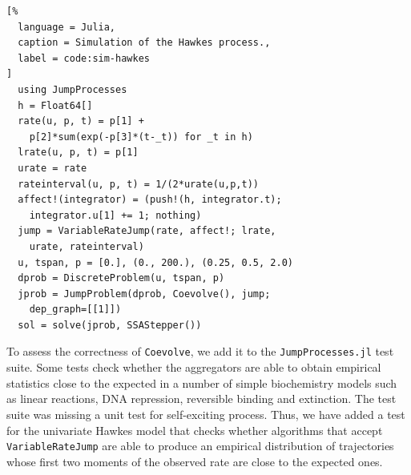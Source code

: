 \documentclass{juliacon}
\numberwithin{equation}{section}
\begin{document}
\begin{lstlisting}[%
  language = Julia,
  caption = Simulation of the Hawkes process.,
  label = code:sim-hawkes
]
  using JumpProcesses
  h = Float64[]
  rate(u, p, t) = p[1] +
    p[2]*sum(exp(-p[3]*(t-_t)) for _t in h)
  lrate(u, p, t) = p[1]
  urate = rate
  rateinterval(u, p, t) = 1/(2*urate(u,p,t))
  affect!(integrator) = (push!(h, integrator.t);
    integrator.u[1] += 1; nothing)
  jump = VariableRateJump(rate, affect!; lrate,
    urate, rateinterval)
  u, tspan, p = [0.], (0., 200.), (0.25, 0.5, 2.0)
  dprob = DiscreteProblem(u, tspan, p)
  jprob = JumpProblem(dprob, Coevolve(), jump;
    dep_graph=[[1]])
  sol = solve(jprob, SSAStepper())
\end{lstlisting}

To assess the correctness of \texttt{Coevolve}, we add it to the \texttt{JumpProcesses.jl} test suite. Some tests check whether the aggregators are able to obtain empirical statistics close to the expected in a number of simple biochemistry models such as linear reactions, DNA repression, reversible binding and extinction. The test suite was missing a unit test for self-exciting process. Thus, we have added a test for the univariate Hawkes model that checks whether algorithms that accept \texttt{VariableRateJump} are able to produce an empirical distribution of trajectories whose first two moments of the observed rate are close to the expected ones.
\end{document}
